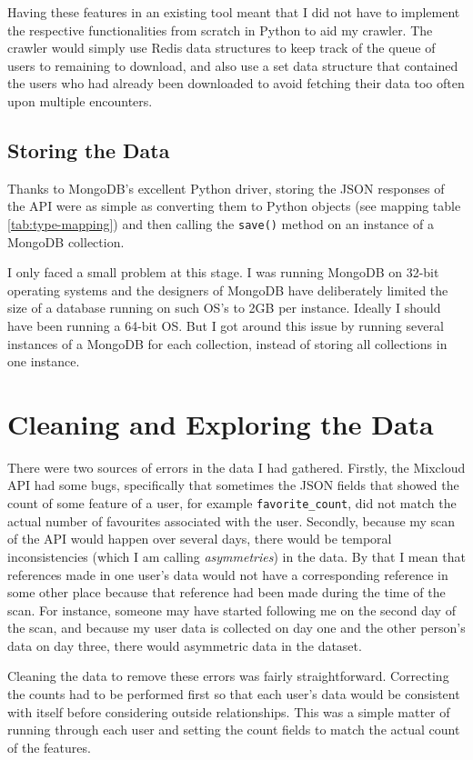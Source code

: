 \documentclass[a4paper,12pt,twoside,notitlepage]{report}
\begin{document}
Having these features in an existing tool meant that I did not have to implement
the respective functionalities from scratch in Python to aid my crawler. The
crawler would simply use Redis data structures to keep track of the queue of
users to remaining to download, and also use a set data structure that contained
the users who had already been downloaded to avoid fetching their data too
often upon multiple encounters.

\subsection{Storing the Data}

Thanks to MongoDB's excellent Python driver, storing the JSON responses of the
API were as simple as converting them to Python objects (see mapping table
\ref{tab:type-mapping}) and then calling the \texttt{save()} method on an
instance of a MongoDB collection.

I only faced a small problem at this stage. I was running MongoDB on 32-bit
operating systems and the designers of MongoDB have deliberately limited the
size of a database running on such OS's to 2GB per instance. Ideally I should
have been running a 64-bit OS. But I got around this issue by running several
instances of a MongoDB for each collection, instead of storing all collections
in one instance.

\section{Cleaning and Exploring the Data}

There were two sources of errors in the data I had gathered. Firstly, the
Mixcloud API had some bugs, specifically that sometimes the JSON fields that
showed the count of some feature of a user, for example
\texttt{favorite\_count}, did not match the actual number of favourites
associated with the user. Secondly, because my scan of the API would happen over
several days, there would be temporal inconsistencies (which I am calling
\emph{asymmetries}) in the data. By that I mean that references made in one
user's data would not have a corresponding reference in some other place because
that reference had been made during the time of the scan. For instance, someone
may have started following me on the second day of the scan, and because my user
data is collected on day one and the other person's data on day three, there
would asymmetric data in the dataset.

Cleaning the data to remove these errors was fairly straightforward. Correcting
the counts had to be performed first so that each user's data would be
consistent with itself before considering outside relationships. This was a
simple matter of running through each user and setting the count fields to
match the actual count of the features.
\end{document}
